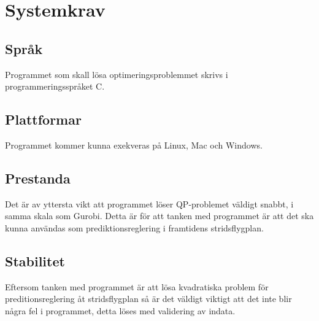 \section{Systemkrav}

\subsection{Språk}
Programmet som skall lösa optimeringsproblemmet skrivs i programmeringsspråket C.

\subsection{Plattformar}
Programmet kommer kunna exekveras på Linux, Mac och Windows.

\subsection{Prestanda}
Det är av yttersta vikt att programmet löser QP-problemet väldigt snabbt, i samma skala som Gurobi. Detta är för att tanken med programmet är att det ska kunna användas som prediktionsreglering i framtidens stridsflygplan.

\subsection{Stabilitet}
Eftersom tanken med programmet är att lösa kvadratiska problem för preditionsreglering åt stridsflygplan så är det väldigt viktigt att det inte blir några fel i programmet, detta löses med validering av indata.